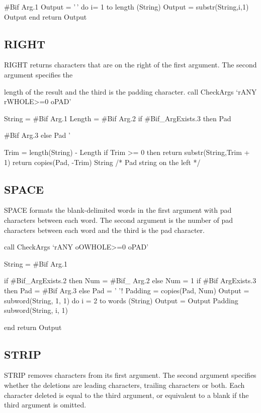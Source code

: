 \#Bif Arg.1 Output = '\,' do i= 1 to length (String) Output =
substr(String,i,1) \textbar\textbar{} Output end return Output

\hypertarget{right}{%
\subsection{RIGHT}\label{right}}

RIGHT returns characters that are on the right of the first argument.
The second argument specifies the

length of the result and the third is the padding character. call
CheckArgs `rANY rWHOLE\textgreater=0 oPAD'

String = \#Bif Arg.1 Length = \#Bif Arg.2 if \#Bif\_ArgExists.3 then Pad

\#Bif Arg.3 else Pad '

Trim = length(String) - Length if Trim \textgreater= 0 then return
substr(String,Trim + 1) return copies(Pad, -Trim) \textbar\textbar{}
String /* Pad string on the left */

\hypertarget{space}{%
\subsection{SPACE}\label{space}}

SPACE formats the blank-delimited words in the first argument with pad
characters between each word. The second argument is the number of pad
characters between each word and the third is the pad character.

call CheckArgs `rANY oOWHOLE\textgreater=0 oPAD'

String = \#Bif Arg.1

if \#Bif\_ArgExists.2 then Num = \#Bif\_ Arg.2 else Num = 1 if \#Bif
ArgExists.3 then Pad = \#Bif Arg.3 else Pad = ' '! Padding = copies(Pad,
Num) Output = subword(String, 1, 1) do i = 2 to words (String) Output =
Output \textbar\textbar{} Padding \textbar\textbar{} subword(String, i,
1)

end return Output

\hypertarget{strip}{%
\subsection{STRIP}\label{strip}}

STRIP removes characters from its first argument. The second argument
specifies whether the deletions are leading characters, trailing
characters or both. Each character deleted is equal to the third
argument, or equivalent to a blank if the third argument is omitted.


